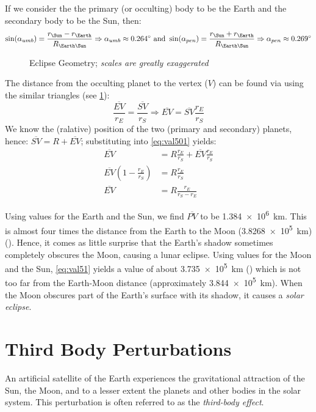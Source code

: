 If we consider the the primary (or occulting) body to be the Earth and the 
secondary body to be the Sun, then:
\begin{equation}
    \sin({\alpha}_{umb}) = \frac{r_{\Sun} - r_{\Earth}}{R_{\Earth\Sun}} 
    \Rightarrow {\alpha}_{umb} \approx \SI{0.264}{\degree}
    \text{ and }
    \sin({\alpha}_{pen}) = \frac{r_{\Sun} + r_{\Earth}}{R_{\Earth\Sun}}
    \Rightarrow {\alpha}_{pen} \approx \SI{0.269}{\degree}
\end{equation}

\begin{figure}
\centering

\caption{Eclipse Geometry; \emph{scales are greatly exaggerated}}
\label{fig:eclipse-geometry}
\end{figure}

The distance from the occulting planet to the vertex (\(V\)) can be found via 
using the similar triangles (see \ref{fig:eclipse-geometry}):
\begin{equation}
    \label{eq:val501}
    \frac{\overline{EV}}{r_{E}} = \frac{\overline{SV}}{r_S} \Rightarrow \overline{EV} = \overline{SV} \frac{r_E}{r_S}
\end{equation}
We know the (ralative) position of the two (primary and secondary) planets, hence:
\(\overline{SV} = R + \overline{EV}\); substituting into \ref{eq:val501} yields:
\begin{align*}
    \label{eq:val51}
    \overline{EV} &= R \frac{r_E}{r_S} + \overline{EV} \frac{r_E}{r_S} \\
    \overline{EV} (1-\frac{r_E}{r_S}) &= R \frac{r_E}{r_S} \\
    \overline{EV} &= R \frac{r_E}{r_S - r_E}
\end{align*}

Using values for the Earth and the Sun, we find \(\overline{PV}\) to 
be \SI{1.384e6}{\km}. This is almost four times the distance from the 
Earth to the Moon (\SI{3.8268e5}{\km}) (\cite{Vallado}). Hence, it comes as little surprise 
that the Earth's shadow sometimes completely obscures the Moon, causing a 
lunar eclipse. Using values for the Moon and the Sun, 
\ref{eq:val51} yields a value of about \SI{3.735e5}{\km} (\cite{Vallado}) 
which is not too far from the Earth-Moon distance (approximately 
\SI{3.844e5}{\km}). When the Moon obscures part of the Earth's surface with its 
shadow, it causes a \emph{solar eclipse}.

\section{Third Body Perturbations}
An artificial satellite of the Earth experiences the gravitational attraction of
the Sun, the Moon, and to a lesser extent the planets and other bodies in the solar 
system. This perturbation is often referred to as the \emph{third-body effect}.

